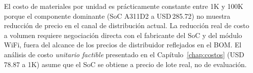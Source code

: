 \begin{infobox}
  El costo de materiales por unidad es prácticamente constante entre 1K y
  100K porque el componente dominante (SoC A311D2 a USD\,285.72) no
  muestra reducción de precio en el canal de distribución actual. La
  reducción real de costo a volumen requiere negociación directa con el
  fabricante del SoC y del módulo WiFi, fuera del alcance de los precios de
  distribuidor reflejados en el BOM. El análisis de costo \emph{unitario
  factible} presentado en el Capítulo~\ref{chap:costos} (USD\,78.87 a 1K)
  asume que el SoC se obtiene a precio de lote real, no de evaluación.
\end{infobox}

